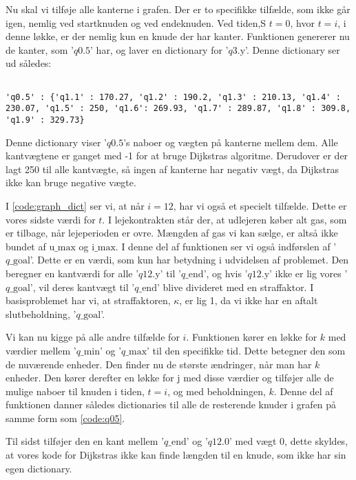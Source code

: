 Nu skal vi tilføje alle kanterne i grafen. Der er to specifikke tilfælde, som ikke går igen, nemlig ved startknuden og ved endeknuden. Ved tiden,S $t=0$, hvor $t=i$, i denne løkke, er der nemlig kun en knude der har kanter. Funktionen genererer nu de kanter, som '$q\textrm{0.5}$' har, og laver en dictionary for '$q\textrm{3.y}$'. 
Denne dictionary ser ud således:

\begin{lstlisting}[label=code:q05, caption=Dictionary for $q \textrm{0.5}$.]

'q0.5' : {'q1.1' : 170.27, 'q1.2' : 190.2, 'q1.3' : 210.13, 'q1.4' : 230.07, 'q1.5' : 250, 'q1.6': 269.93, 'q1.7' : 289.87, 'q1.8' : 309.8, 'q1.9' : 329.73}
\end{lstlisting}
Denne dictionary viser '$q0.5$'s naboer og vægten på kanterne mellem dem. Alle kantvægtene er ganget med -1 for at bruge Dijkstras algoritme. Derudover er der lagt 250 til alle kantvægte, så ingen af kanterne har negativ vægt, da Dijkstras ikke kan bruge negative vægte. 

I \autoref{code:graph_dict} ser vi, at når $i=12$, har vi også et specielt tilfælde. Dette er vores sidste værdi for $t$. I lejekontrakten står der, at udlejeren køber alt gas, som er tilbage, når lejeperioden er ovre. Mængden af gas vi kan sælge, er altså ikke bundet af $\textrm{u\_max}$ og $\textrm{i\_max}$. I denne del af funktionen ser vi også indførslen af '$q\textrm{\_goal}$'. Dette er en værdi, som kun har betydning i udvidelsen af problemet. Den beregner  en kantværdi for alle '$q\textrm{12.y}$' til '$q\textrm{\_end}$', og hvis '$q\textrm{12.y}$' ikke er lig vores '$q\textrm{\_goal}$', vil deres kantvægt til '$q\textrm{\_end}$' blive divideret med en straffaktor. I basisproblemet har vi, at straffaktoren, $\kappa$, er lig 1, da vi ikke har en aftalt slutbeholdning, '$q\textrm{\_goal}$'.

Vi kan nu kigge på alle andre tilfælde for $i$. Funktionen kører en løkke for $k$ med værdier mellem '$q\textrm{\_min}$' og '$q\textrm{\_max}$' til den specifikke tid. Dette betegner den som de nuværende enheder.
Den finder nu de største ændringer, når man har $k$ enheder. Den kører derefter en løkke for $\textrm{j}$ med disse værdier og tilføjer alle de mulige naboer til knuden i tiden, $t=i$, og med beholdningen, $k$. Denne del af funktionen danner således dictionaries til alle de resterende knuder i grafen på samme form som \autoref{code:q05}.

Til sidst tilføjer den en kant mellem '$q\textrm{\_end}$' og '$q12.0$' med vægt $0$, dette skyldes, at vores kode for Dijkstras ikke kan finde længden til en knude, som ikke har sin egen dictionary.

